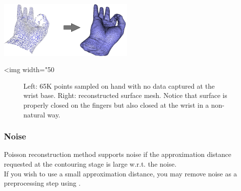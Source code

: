\begin{center}
    \label{Surface_reconstruction_points_3-fig-holes_bad}
    \begin{ccTexOnly}
      \includegraphics[width=0.5\textwidth]{Surface_reconstruction_points_3/holes_bad} %
    \end{ccTexOnly}
    \begin{ccHtmlOnly}
        <img width="50%
    \end{ccHtmlOnly}
    \begin{figure}[h]
        \caption{Left: 65K points sampled on hand with no data captured at the wrist base.
                 Right: reconstructed surface mesh. Notice that surface is properly closed on the fingers
                 but also closed at the wrist in a non-natural way.}
    \end{figure}
\end{center}


\subsubsection{Noise}

Poisson reconstruction method supports noise if the approximation distance requested at the contouring stage is large w.r.t. the noise.\\
If you wish to use a small approximation distance, you may remove noise as a preprocessing step using .

